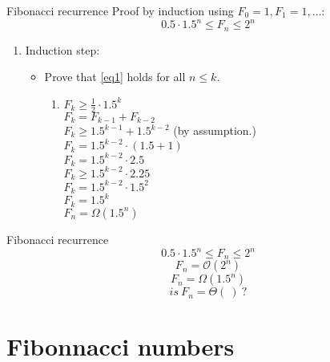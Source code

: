 \documentclass{beamer}
\begin{document}
\begin{frame}{Fibonacci recurrence}
Proof by induction using $F_0 = 1, F_1 = 1, \ldots$:
$$0.5 \cdot 1.5^n \leq F_n \leq 2^n$$
    \begin{enumerate}[3]
        \item Induction step:
        \begin{itemize}
            \item Prove that \eqref{eq1} holds for all $n \leq k$.
            \begin{enumerate}[2)]
             \item $ F_k \geq \frac{1}{2} \cdot 1.5^k $ \\
                $ F_k = F_{k-1} + F_{k-2} $ \\
                $ F_k \geq 1.5^{k-1} + 1.5^{k-2} $ {\scriptsize (by assumption.)} \\
                $ F_k = 1.5^{k-2} \cdot (1.5 + 1) $ \\
                $ F_k = 1.5^{k-2} \cdot 2.5 $ \\
                $ F_k \geq 1.5^{k-2} \cdot 2.25 $ \\
                $ F_k = 1.5^{k-2} \cdot 1.5^2 $ \\
                $ F_k = 1.5^k $ \\
                \vspace{0.3cm}
                $ F_n = \Omega (1.5^n) $
            \end{enumerate}
        \end{itemize}
    \end{enumerate}
\end{frame}

\begin{frame}{Fibonacci recurrence}
    $$ 0.5 \cdot 1.5^n \leq F_n \leq 2^n $$
    \vspace{0.2cm}
    $$ F_n = \mathcal{O}(2^n) $$
    $$ F_n = \Omega (1.5^n) $$
    $$ is \ F_n = \Theta (\ ) \ ? $$
\end{frame}

\section{Fibonnacci numbers}
\end{document}
